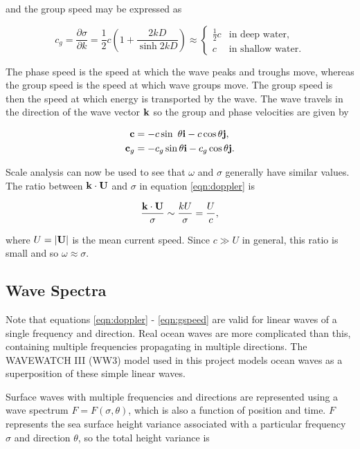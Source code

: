 and the group speed may be expressed as

\begin{equation}
c_g = \frac{\partial\sigma}{\partial k} = \frac{1}{2}c \left(1 + \frac{2kD}{\sinh{2kD}} \right) \approx \begin{cases}
    \frac{1}{2} c &\text{in deep water}, \\
    c &\text{in shallow water}.
\end{cases}
\label{eqn:gspeed}
\end{equation}

The phase speed is the speed at which the wave peaks and troughs move, whereas the group speed is the speed at which wave groups move. The group speed is then the speed at which energy is transported by the wave. The wave travels in the direction of the wave vector $\mathbf{k}$ so the group and phase velocities are given by

\begin{align*}
\mathbf{c}& = - c \sin\ \theta \mathbf{i} - c \cos \theta \mathbf{j}, \\
\mathbf{c}_g& = - c_g \sin \theta \mathbf{i} - c_g \cos \theta \mathbf{j}.
\end{align*}

Scale analysis can now be used to see that $\omega$ and $\sigma$ generally have similar values. The ratio between $\mathbf{k}\cdot\mathbf{U}$ and $\sigma$ in equation \ref{eqn:doppler} is

\[
\frac{\mathbf{k}\cdot\mathbf{U}}{\sigma} \sim \frac{kU}{\sigma} = \frac U c,
\]

where $U = |\mathbf{U}|$ is the mean current speed. Since $c \gg U$ in general, this ratio is small and so $\omega \approx \sigma$.

\subsection{Wave Spectra}
\label{sec:wavespectra}

Note that equations \ref{eqn:doppler} - \ref{eqn:gspeed} are valid for linear waves of a single frequency and direction. Real ocean waves are more complicated than this, containing multiple frequencies propagating in multiple directions. The WAVEWATCH III (WW3) model used in this project models ocean waves as a superposition of these simple linear waves.

Surface waves with multiple frequencies and directions are represented using a wave spectrum $F = F(\sigma,\theta)$, which is also a function of position and time. $F$ represents the sea surface height variance associated with a particular frequency $\sigma$ and direction $\theta$, so the total height variance is 

